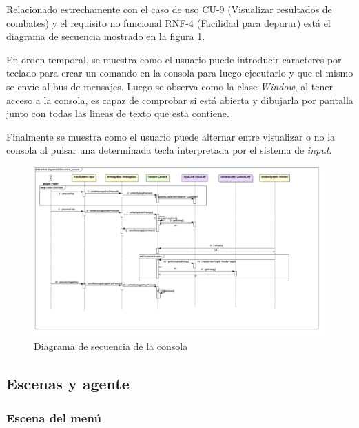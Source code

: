 Relacionado estrechamente con el caso de uso CU-9 (Visualizar resultados de combates) y el requisito no funcional RNF-4 (Facilidad para depurar) está el diagrama de secuencia mostrado en la figura \ref{sec:console}.

\bigskip

En orden temporal, se muestra como el usuario puede introducir caracteres por teclado para crear un comando en la consola para luego ejecutarlo y que el mismo se envíe al bus de mensajes. Luego se observa como la clase \textit{Window}, al tener acceso a la consola, es capaz de comprobar si está abierta y dibujarla por pantalla junto con todas las lineas de texto que esta contiene.

\bigskip

Finalmente se muestra como el usuario puede alternar entre visualizar o no la consola al pulsar una determinada tecla interpretada por el sistema de \textit{input}.

\begin{landscape}
\begin{figure}
	\hspace*{-3cm}  
	\includegraphics[width=24cm]{otros/UML/png/alld/png/CasosDeUso__Especifico__Collaboration4__Interaction1__diagramaDeSecuencia_consola_20.png}
	\caption{Diagrama de secuencia de la consola}
	\label{sec:console}
\end{figure}
\end{landscape}


\subsection{Escenas y agente}

\subsubsection*{Escena del menú}

